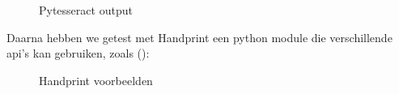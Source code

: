 \documentclass[12pt]{article}
\begin{document}
\begin{multicols}{2}
\begin{figure}[H]
    \caption{Pytesseract output}\label{fig:pytesseract-output}
\end{figure}
Daarna hebben we getest met Handprint een python module die verschillende api's kan gebruiken, zoals (\cite{azureManual, googlecloudvisionManual}):
\begin{figure}[H]%
    \centering
    \qquad
    \caption{Handprint voorbeelden}\label{fig:example}%
\end{figure}

\end{multicols}
\end{document}
